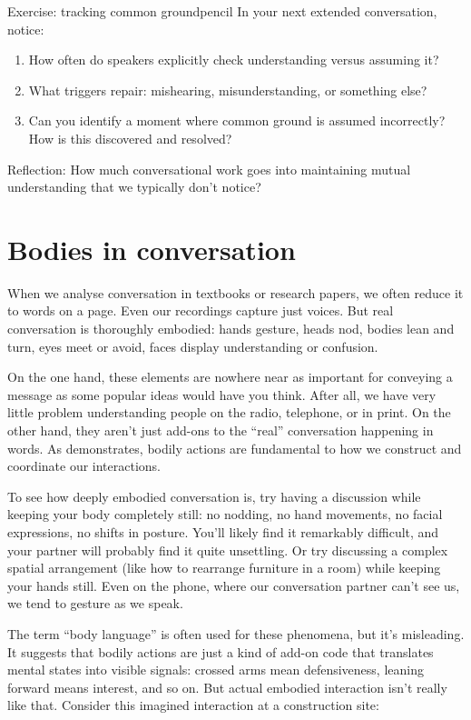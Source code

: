\begin{tblsframedsymbol}{Exercise: tracking common ground}{pencil}
In your next extended conversation, notice:
\begin{enumerate}[noitemsep, leftmargin=*]
    \item How often do speakers explicitly check understanding versus assuming it?
    \item What triggers repair: mishearing, misunderstanding, or something else?
    \item Can you identify a moment where common ground is assumed incorrectly? How is this discovered and resolved?
\end{enumerate}
Reflection: How much conversational work goes into maintaining mutual understanding that we typically don't notice?
\end{tblsframedsymbol}

\section{Bodies in conversation} \label{sec:bodies}

When we analyse conversation in textbooks or research papers, we often reduce it to words on a page. Even our recordings capture just voices. But real conversation is thoroughly embodied: hands gesture, heads nod, bodies lean and turn, eyes meet or avoid, faces display understanding or confusion.

On the one hand, these elements are nowhere near as important for conveying a message as some popular ideas would have you think. After all, we have very little problem understanding people on the radio, telephone, or in print. On the other hand, they aren't just add-ons to the \enquote{real} conversation happening in words. As \citet{goodwin2000} demonstrates, bodily actions are fundamental to how we construct and coordinate our interactions.

To see how deeply embodied conversation is, try having a discussion while keeping your body completely still: no nodding, no hand movements, no facial expressions, no shifts in posture. You'll likely find it remarkably difficult, and your partner will probably find it quite unsettling. Or try discussing a complex spatial arrangement (like how to rearrange furniture in a room) while keeping your hands still. Even on the phone, where our conversation partner can't see us, we tend to gesture as we speak.

The term \enquote{body language} is often used for these phenomena, but it's misleading. It suggests that bodily actions are just a kind of add-on code that translates mental states into visible signals: crossed arms mean defensiveness, leaning forward means interest, and so on. But actual embodied interaction isn't really like that. Consider this imagined interaction at a construction site:


